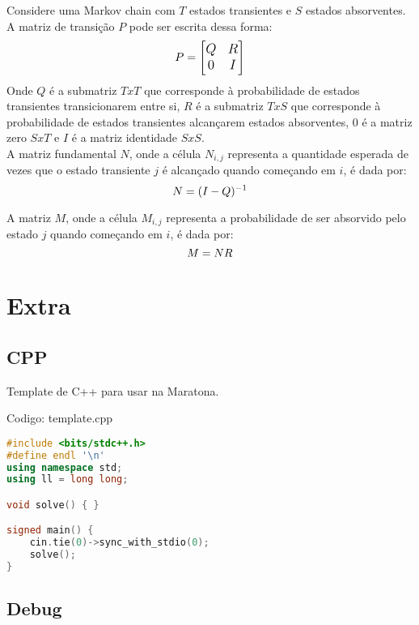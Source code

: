 \documentclass[10pt, a4paper, oneside]{book}
\begin{document}
Considere uma Markov chain com $T$ estados transientes e $S$ estados absorventes. A matriz de transição $P$ pode ser escrita dessa forma:
\begin{equation*}
\large{
P = \begin{bmatrix}
Q & R \\
0 & I
\end{bmatrix}
}
\end{equation*}
Onde $Q$ é a submatriz $TxT$ que corresponde à probabilidade de estados transientes transicionarem entre si, $R$ é a submatriz $TxS$ que corresponde à probabilidade de estados transientes alcançarem estados absorventes, $0$ é a matriz zero $SxT$ e $I$ é a matriz identidade $SxS$.\\
A matriz fundamental $N$, onde a célula $N_{i,j}$ representa a quantidade esperada de vezes que o estado transiente $j$ é alcançado quando começando em $i$, é dada por:
\begin{equation*}
\large{
N = (I - Q)^{-1}
}
\end{equation*}

A matriz $M$, onde a célula $M_{i,j}$ representa a probabilidade de ser absorvido pelo estado $j$ quando começando em $i$, é dada por:
\begin{equation*}
\large{
M = N R
}
\end{equation*}

\newpage

%
%
%
%

\chapter{Extra}

\section{CPP}


Template de C++ para usar na Maratona.
\hfill

Codigo: template.cpp

\begin{lstlisting}[language=C++]
#include <bits/stdc++.h>
#define endl '\n'
using namespace std;
using ll = long long;

void solve() { }

signed main() {
    cin.tie(0)->sync_with_stdio(0);
    solve();
}
\end{lstlisting}
\hfill

\section{Debug}
\end{document}
